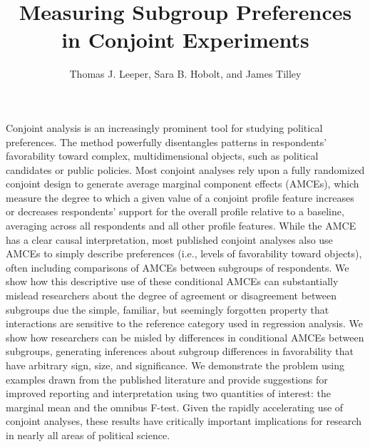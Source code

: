 \documentclass[a4paper,12pt]{article}\usepackage[]{graphicx}\usepackage[]{color}
\title{Measuring Subgroup Preferences in Conjoint Experiments}
\author{Thomas J. Leeper, Sara B. Hobolt, and James Tilley}
\begin{document}
\maketitle

{\abstract Conjoint analysis is an increasingly prominent tool for studying political preferences. The method powerfully disentangles patterns in respondents' favorability toward complex, multidimensional objects, such as political candidates or public policies. Most conjoint analyses rely upon a fully randomized conjoint design to generate average marginal component effects (AMCEs), which measure the degree to which a given value of a conjoint profile feature increases or decreases respondents' support for the overall profile relative to a baseline, averaging across all respondents and all other profile features. While the AMCE has a clear causal interpretation, most published conjoint analyses also use AMCEs to simply describe preferences (i.e., levels of favorability toward objects), often including comparisons of AMCEs between subgroups of respondents. We show how this descriptive use of these conditional AMCEs can substantially mislead researchers about the degree of agreement or disagreement between subgroups due the simple, familiar, but seemingly forgotten property that interactions are sensitive to the reference category used in regression analysis. We show how researchers can be misled by differences in conditional AMCEs between subgroups, generating inferences about subgroup differences in favorability that have arbitrary sign, size, and significance. We demonstrate the problem using examples drawn from the published literature and provide suggestions for improved reporting and interpretation using two quantities of interest: the marginal mean and the omnibus F-test. Given the rapidly accelerating use of conjoint analyses, these results have critically important implications for research in nearly all areas of political science.}

















\clearpage
\end{document}
